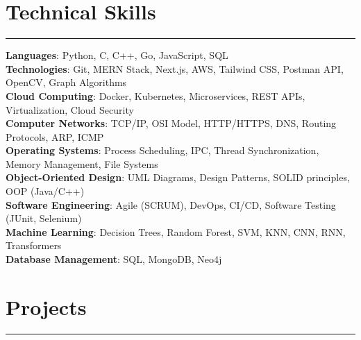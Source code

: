 \documentclass[a4paper,10.5pt]{article}
\begin{document}
\vspace{-0.5em}

\section*{Technical Skills}
\vspace{-.2em}
\hrule
\vspace{0.3em}

\textbf{Languages}: Python, C, C++, Go, JavaScript, SQL \vspace{0.3em} \\
\textbf{Technologies}: Git, MERN Stack, Next.js, AWS, Tailwind CSS, Postman API, OpenCV, Graph Algorithms \vspace{0.3em}\\
\textbf{Cloud Computing}: Docker, Kubernetes, Microservices, REST APIs, Virtualization, Cloud Security \vspace{0.3em} \\
\textbf{Computer Networks}: TCP/IP, OSI Model, HTTP/HTTPS, DNS, Routing Protocols, ARP, ICMP \vspace{0.3em} \\
\textbf{Operating Systems}: Process Scheduling, IPC, Thread Synchronization, Memory Management, File Systems \vspace{0.3em} \\
\textbf{Object-Oriented Design}: UML Diagrams, Design Patterns, SOLID principles, OOP (Java/C++) \vspace{0.3em} \\
\textbf{Software Engineering}: Agile (SCRUM), DevOps, CI/CD, Software Testing (JUnit, Selenium) \vspace{0.3em}\\
\textbf{Machine Learning}: Decision Trees, Random Forest, SVM, KNN, CNN, RNN, Transformers \vspace{0.3em}\\
\textbf{Database Management}: SQL, MongoDB, Neo4j \\

\vspace{-2.8em}

\section*{Projects}
\vspace{-.5em}
\hrule
\vspace{0.3em}
\end{document}
